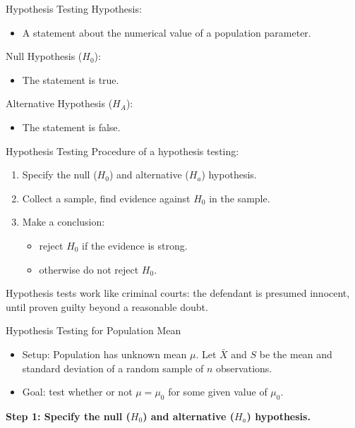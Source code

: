 \documentclass{beamer}
\begin{document}
\begin{frame}{Hypothesis Testing}
Hypothesis:
\begin{itemize}
\item  A statement about the numerical value of a population parameter.
\end{itemize}
Null Hypothesis ($H_0$):
\begin{itemize}
\item The statement is true.
\end{itemize}
Alternative Hypothesis ($H_A$):
\begin{itemize}
\item The statement is false.
\end{itemize}
\end{frame}

\begin{frame}{Hypothesis Testing}
Procedure of a hypothesis testing:
\begin{enumerate}
\item Specify the null ($H_0$) and alternative ($H_a$) hypothesis.
\item Collect a sample, find evidence against $H_0$ in the sample.
\item Make a conclusion:
\begin{itemize}
\item reject $H_0$ if the evidence is strong.
\item otherwise do not reject $H_0$.
\end{itemize}
\end{enumerate}

Hypothesis tests work like criminal courts: the defendant is presumed innocent, until proven guilty beyond a reasonable doubt.
\end{frame}


\begin{frame}{Hypothesis Testing for Population Mean}
\begin{itemize}
\item Setup: Population has unknown mean $\mu$. Let $\bar X$ and $S$ be the mean and standard deviation of a random sample of $n$ observations. 
\item Goal: test whether or not $\mu=\mu_0$ for some given value of $\mu_0$.
\end{itemize}

\textbf{Step 1: Specify the null ($H_0$) and alternative ($H_a$) hypothesis.}
\end{frame}
\end{document}
